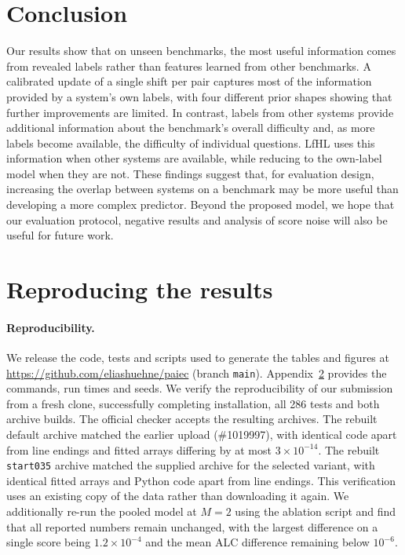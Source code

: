 \documentclass{article}
\newcommand{\lfhl}{LfHL}
\newcommand{\repo}{\url{https://github.com/eliashuehne/paiec}}
\newcommand{\code}[1]{\texttt{#1}}
\begin{document}
\section{Conclusion}
\label{sec:conclusion}

Our results show that on unseen benchmarks, the most useful information comes from revealed labels rather than features learned from other benchmarks. A calibrated update of a single shift per pair captures most of the information provided by a system's own labels, with four different prior shapes showing that further improvements are limited. In contrast, labels from other systems provide additional information about the benchmark's overall difficulty and, as more labels become available, the difficulty of individual questions. \lfhl{} uses this information when other systems are available, while reducing to the own-label model when they are not. These findings suggest that, for evaluation design, increasing the overlap between systems on a benchmark may be more useful than developing a more complex predictor. Beyond the proposed model, we hope that our evaluation protocol, negative results and analysis of score noise will also be useful for future work.

{\small


}

\newpage
\appendix

\section{Reproducing the results}
\label{app:repro}

\paragraph{Reproducibility.} We release the code, tests and scripts used to generate the tables and figures at \repo{} (branch \code{main}). Appendix~\ref{app:repro} provides the commands, run times and seeds. We verify the reproducibility of our submission from a fresh clone, successfully completing installation, all 286 tests and both archive builds. The official checker accepts the resulting archives. The rebuilt default archive matched the earlier upload (\#1019997), with identical code apart from line endings and fitted arrays differing by at most $3 \times 10^{-14}$. The rebuilt \code{start035} archive matched the supplied archive for the selected variant, with identical fitted arrays and Python code apart from line endings. This verification uses an existing copy of the data rather than downloading it again. We additionally re-run the pooled model at $M=2$ using the ablation script and find that all reported numbers remain unchanged, with the largest difference on a single score being $1.2 \times 10^{-4}$ and the mean ALC difference remaining below $10^{-6}$.
\end{document}

